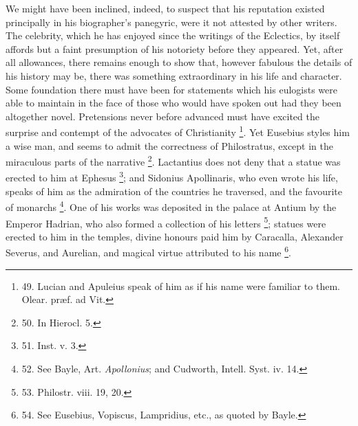 We might have been inclined,
indeed, to suspect that his reputation existed principally in his
biographer's panegyric, were it not attested by other writers. The
celebrity, which he has enjoyed since the writings of the Eclectics,
by itself affords but a faint presumption of his notoriety before they
appeared. Yet, after all allowances, there remains enough to show
that, however fabulous the details of his history may be, there was
something extraordinary in his life and character. Some foundation
there must have been for statements which his eulogists were able to
maintain in the face of those who would have spoken out had they been
altogether novel. Pretensions never before advanced must have excited
the surprise and contempt of the advocates of Christianity \footnote{49.
Lucian and Apuleius speak of him as if his name were familiar to them.
Olear. præf. ad Vit.}. Yet Eusebius styles him a wise man, and seems to admit the
correctness of Philostratus, except in the miraculous parts of the
narrative \footnote{50.
In Hierocl. 5.}. Lactantius
does not deny that a statue was erected to him at Ephesus \footnote{51.
Inst. v. 3.}; and Sidonius Apollinaris, who even wrote his life, speaks of
him as the admiration of the countries he traversed, and the favourite
of monarchs \footnote{52.
See Bayle, Art. \emph{Apollonius}; and Cudworth, Intell. Syst. iv. 14.}. One of
his works was deposited in the palace at Antium by the Emperor
Hadrian, who also formed a collection of his letters \footnote{53.
Philostr. viii. 19, 20.}; statues were erected to him in the temples, divine honours
paid him by Caracalla, Alexander Severus, and Aurelian, and magical
virtue attributed to his name \footnote{54.
See Eusebius, Vopiscus, Lampridius, etc., as quoted by Bayle.}.

